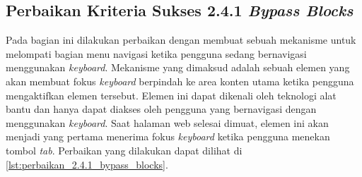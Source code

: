 \subsection{Perbaikan Kriteria Sukses 2.4.1 \textit{Bypass Blocks}}
\label{subsec:perbaikan_kriteria_sukses_2.4.1}
Pada bagian ini dilakukan perbaikan dengan membuat sebuah mekanisme untuk melompati bagian menu navigasi ketika pengguna sedang bernavigasi menggunakan \textit{keyboard}. Mekanisme yang dimaksud adalah sebuah elemen yang akan membuat fokus \textit{keyboard} berpindah ke area konten utama ketika pengguna mengaktifkan elemen tersebut. Elemen ini dapat dikenali oleh teknologi alat bantu dan hanya dapat diakses oleh pengguna yang bernavigasi dengan menggunakan \textit{keyboard}. Saat halaman web selesai dimuat, elemen ini akan menjadi yang pertama menerima fokus \textit{keyboard} ketika pengguna menekan tombol \textit{tab}. Perbaikan yang dilakukan dapat dilihat di \ref{lst:perbaikan_2.4.1_bypass_blocks}.
